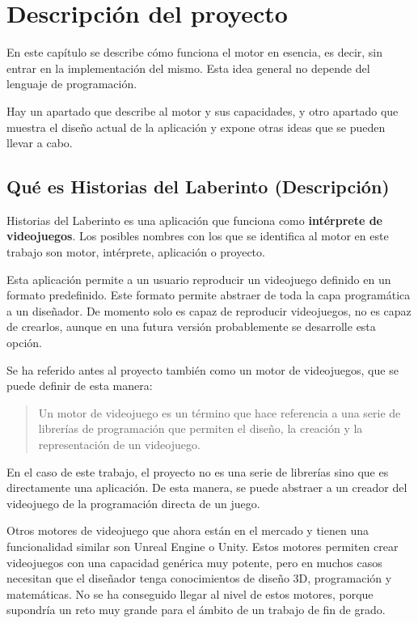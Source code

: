 \chapter{Descripción del proyecto}
En este capítulo se describe cómo funciona el motor en esencia, es decir, sin entrar en la implementación del mismo. Esta idea general no depende del lenguaje de programación.

Hay un apartado que describe al motor y sus capacidades, y otro apartado que muestra el diseño actual de la aplicación y expone otras ideas que se pueden llevar a cabo.

\section{Qué es Historias del Laberinto (Descripción)}
Historias del Laberinto es una aplicación que funciona como \textbf{intérprete de videojuegos}. Los posibles nombres con los que se identifica al motor en este trabajo son motor, intérprete, aplicación o proyecto.

Esta aplicación permite a un usuario reproducir un videojuego definido en un formato predefinido. Este formato permite abstraer de toda la capa programática a un diseñador.
De momento solo es capaz de reproducir videojuegos, no es capaz de crearlos, aunque en una futura versión probablemente se desarrolle esta opción.

Se ha referido antes al proyecto también como un motor de videojuegos, que se puede definir de esta manera:
\begin{quote}
	\small Un motor de videojuego es un término que hace referencia a una serie de librerías de programación que permiten el diseño, la creación y la representación de un videojuego. \cite{Alberto_Carrasco}
\end{quote}

En el caso de este trabajo, el proyecto no es una serie de librerías sino que es directamente una aplicación. De esta manera, se puede abstraer a un creador del videojuego de la programación directa de un juego.

Otros motores de videojuego que ahora están en el mercado y tienen una funcionalidad similar son Unreal Engine\cite{unrealEngineHomepage} o Unity\cite{unity3dHomepage}. Estos motores permiten crear videojuegos con una capacidad genérica muy potente, pero en muchos casos necesitan que el diseñador tenga conocimientos de diseño 3D, programación y matemáticas. No se ha conseguido llegar al nivel de estos motores, porque supondría un reto muy grande para el ámbito de un trabajo de fin de grado.

